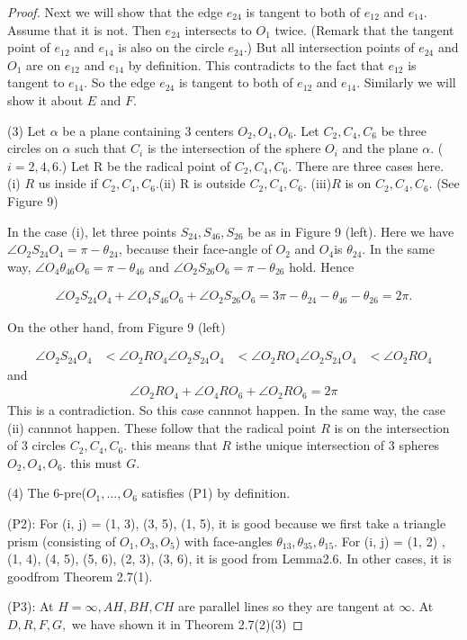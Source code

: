 \documentclass[dvipdfmx]{interact}
\theoremstyle{plain}%
\theoremstyle{definition}
\theoremstyle{remark}
\theoremstyle{problemstyle}
\begin{document}
\begin{proof}
Next we will show that the edge $e_{24}$ is tangent to both of $e_{12}$ and
 $e_{14}$. Assume that it is not. Then $e_{24}$ intersects to $O_1$
 twice.
(Remark that the tangent point of $e_{12}$ and $e_{14}$ is also on the
 circle $e_{24}$.) But all intersection points of $e_{24}$ and $O_1$ are
 on $e_{12}$ and $e_{14}$ by definition. This contradicts to the fact
 that $e_{12}$ is tangent to $e_{14}$. So the edge $e_{24}$ is tangent
 to both of $e_{12}$ and $e_{14}$. Similarly we will show it about $E$
 and $F$.

(3) Let $\alpha$ be a plane containing 3 centers $O_2, O_4, O_6$. Let
 $C_2, C_4, C_6$ be three circles on $\alpha$ such that $C_i$ is the
 intersection of the sphere $O_i$ and the plane $\alpha$. ($i=2, 4, 6$.)
Let R be the radical point of $C_2, C_4, C_6$. There are three cases
 here.
(i) $R$ us inside if $C_2, C_4, C_6$.(ii) R is outside $C_2, C_4, C_6$.
(iii)$R$ is on $C_2, C_4, C_6$. (See Figure 9)

In the case (i), let three points $S_{24}, S_{46}, S_{26}$ be as in Figure
 9 (left). Here we have $\angle O_2 S_{24} O_4 = \pi - \theta_{24}$,
because their face-angle of $O_2$ and $O_4$is $\theta_{24}$.
In the same way, $\angle O_4\theta_{46}O_6 = \pi - \theta_{46}$ and
$\angle O_2S_{26}O_6 = \pi-\theta_{26}$ hold. Hence

\begin{align*}
 \angle O_2 S_{24} O_4 + \angle O_4 S_{46} O_6 + \angle O_2 S_{26} O_6 = 3\pi -
 \theta_{24} - \theta_{46} - \theta_{26} = 2\pi.
\end{align*}

On the other hand, from Figure 9 (left)

\begin{align*}
 \angle O_2 S_{24} O_4 &< \angle O_2 R O_4
 \angle O_2 S_{24} O_4 &< \angle O_2 R O_4
 \angle O_2 S_{24} O_4 &< \angle O_2 R O_4
\end{align*}
and
\begin{align*}
 \angle O_2 R O_4 + \angle O_4 R O_6 + \angle O_2 R O_6 = 2\pi
\end{align*}
This is a contradiction. So this case cannnot happen. In the same way,
 the case (ii) cannnot happen. These follow that the radical point $R$
 is on the intersection of 3 circles $C_2, C_4, C_6.$ this means that
 $R$ isthe unique intersection of 3 spheres $O_2, O_4, O_6$. this must
 $G$.

(4) The 6-pre($O_1, ..., O_6$ satisfies (P1) by definition.

(P2): For (i, j) = (1, 3), (3, 5), (1, 5), it is good because we first
 take a triangle prism (consisting of $O_1, O_3, O_5$) with face-angles
 $\theta_{13}, \theta_{35}, \theta_{15}.$ For (i, j) = (1, 2)
, (1, 4), (4, 5), (5, 6), (2, 3), (3, 6), it is good from Lemma2.6. In
other cases, it is goodfrom Theorem 2.7(1).

(P3): At $H = \infty, AH, BH, CH$ are parallel lines so they are tangent
 at $\infty$. At $D, R, F, G,$ we have shown it in Theorem 2.7(2)(3)
\end{proof}
\end{document}
